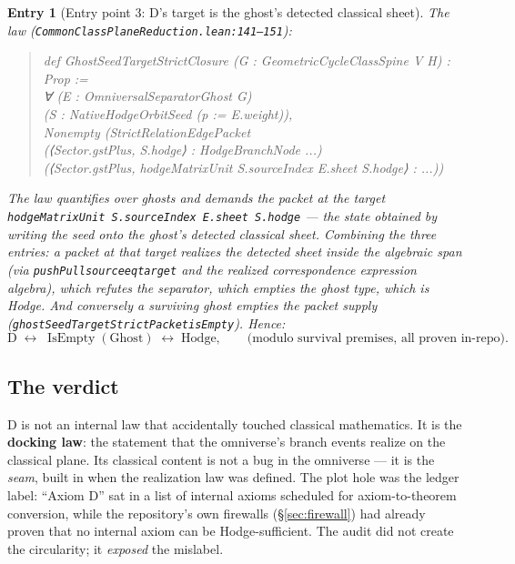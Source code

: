 \documentclass[11pt]{article}
\renewcommand{\_}{\textunderscore\allowbreak}
\newtheorem{xentry}{Entry}
\begin{document}
\begin{xentry}[Entry point 3: D's target is the ghost's detected classical sheet]
\label{entry:D}
The law (\texttt{CommonClassPlaneReduction.lean:141--151}):
\begin{quote}\small\ttfamily
def GhostSeedTargetStrictClosure (G : GeometricCycleClassSpine V H) : Prop :=\\
\phantom{~}∀ (E : OmniversalSeparatorGhost G)\\
\phantom{~~}(S : NativeHodgeOrbitSeed (p := E.weight)),\\
\phantom{~~}Nonempty (StrictRelationEdgePacket\\
\phantom{~~~~}(⟨Sector.gstPlus, S.hodge⟩ : HodgeBranchNode ...)\\
\phantom{~~~~}(⟨Sector.gstPlus, hodgeMatrixUnit S.sourceIndex E.sheet S.hodge⟩ : ...))
\end{quote}
The law quantifies over ghosts and demands the packet at the target
\texttt{hodgeMatrixUnit S.sourceIndex E.sheet S.hodge} --- the state obtained by
writing the seed onto the ghost's detected \emph{classical} sheet. Combining the
three entries: a packet at that target realizes the detected sheet inside the
algebraic span (via \texttt{pushPull\_source\_eq\_target} and the realized
correspondence expression algebra), which refutes the separator, which empties
the ghost type, which is Hodge. And conversely a surviving ghost empties the
packet supply (\texttt{ghostSeedTargetStrictPacket\_isEmpty}). Hence:
\[
\mathrm{D} \;\leftrightarrow\; \operatorname{IsEmpty}(\text{Ghost})
\;\leftrightarrow\; \mathrm{Hodge},
\qquad\text{(modulo survival premises, all proven in-repo).}
\]
\end{xentry}

\subsection{The verdict}

D is not an internal law that accidentally touched classical mathematics.
It is the \textbf{docking law}: the statement that the omniverse's branch events
realize on the classical plane. Its classical content is not a bug in the
omniverse --- it is the \emph{seam}, built in when the realization law was
defined. The plot hole was the ledger label: ``Axiom D'' sat in a list of
internal axioms scheduled for axiom-to-theorem conversion, while the
repository's own firewalls (\S\ref{sec:firewall}) had already proven that no
internal axiom can be Hodge-sufficient. The audit did not create the
circularity; it \emph{exposed} the mislabel.
\end{document}

